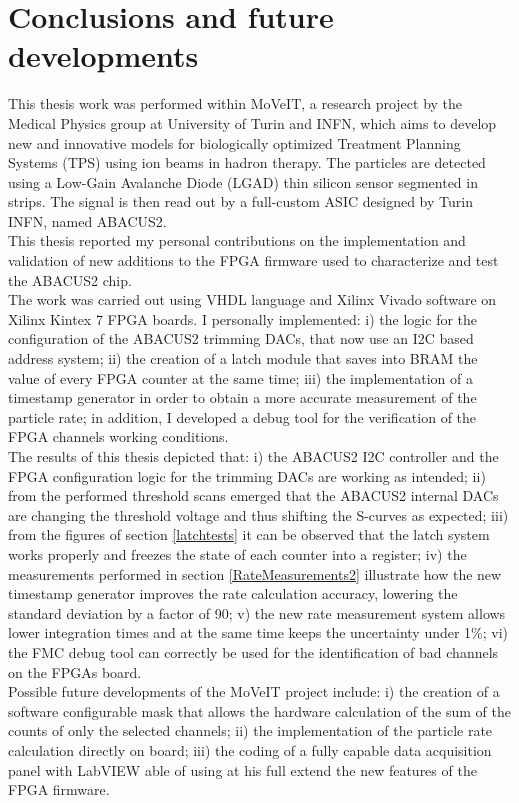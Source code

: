 \chapter*{Conclusions and future developments}
\noindent This thesis work was performed within MoVeIT, a research
project by the Medical Physics group at University of Turin
and INFN, which aims to develop new and
innovative models for biologically optimized Treatment
Planning Systems (TPS) using ion beams in hadron therapy.
The particles are detected using a Low-Gain Avalanche Diode
(LGAD) thin silicon sensor segmented in strips. The signal
is then read out by a full-custom ASIC designed by Turin
INFN, named ABACUS2.\\
\noindent This thesis reported my personal contributions on the
implementation and validation of new additions to the
FPGA firmware used to characterize and test the ABACUS2
chip.\\
\noindent The work was carried out using VHDL language and
Xilinx Vivado software on Xilinx Kintex 7 FPGA boards. 
I personally implemented:
i) the logic for the configuration of the ABACUS2 trimming
DACs, that now use an I2C based address system;
ii) the creation of a latch module that saves into BRAM the
value of every FPGA counter at the same time;
iii) the implementation of a timestamp generator in order
to obtain a more accurate measurement of the particle rate;
in addition, I developed a debug tool for the verification
of the FPGA channels working conditions.\\
\noindent The results of this thesis depicted that:
i) the ABACUS2 I2C controller and the FPGA configuration
logic for the trimming DACs are working as intended; 
ii) from the performed threshold scans emerged that the ABACUS2
internal DACs are changing the threshold voltage and thus
shifting the S-curves as expected;
iii) from the figures of section \ref{latchtests} it can be
observed that the latch system works properly and freezes the state
of each counter into a register;
iv) the measurements performed in section \ref{RateMeasurements2}
illustrate how the new timestamp generator improves the rate
calculation accuracy, lowering the standard deviation by a factor of 90; 
v) the new rate measurement system allows lower integration times
and at the same time keeps the uncertainty under 1\%;
vi) the FMC debug tool can correctly be used for the identification
of bad channels on the FPGAs board.\\
\noindent Possible future developments of the MoVeIT project
include:
i) the creation of a software configurable mask that allows
the hardware calculation of the sum of the counts of only
the selected channels;
ii) the implementation of the particle rate calculation directly
on board;
iii) the coding of a fully capable data acquisition panel with
LabVIEW able of using at his full extend the new features of the
FPGA firmware.



